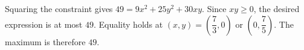 Squaring the constraint gives $49=9x^2+25y^2+30xy$. Since $xy\ge0$, the desired expression is at most $49$. Equality holds at $(x,y) = (\dfrac{7}{3} , 0)$ or $(0 , \dfrac{7}{5})$. The maximum is therefore $\boxed{49}$.
